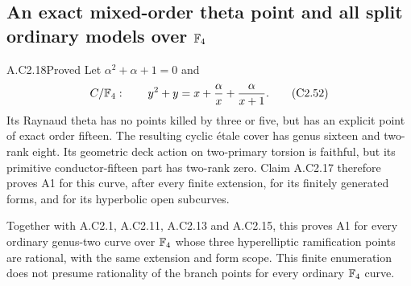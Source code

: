 

\subsection{An exact mixed-order theta point and all split ordinary models over \texorpdfstring{$\mathbb F_4$}{F4}}

\begin{claim}{A.C2.18}{Proved}
Let $\alpha^2+\alpha+1=0$ and
\[
 C/\mathbb F_4:\qquad y^2+y=x+\frac{\alpha}{x}
                         +\frac{\alpha}{x+1}.                 \tag{C2.52}
\]
Its Raynaud theta has no points killed by three or five,
but has an explicit point of exact order fifteen.
The resulting cyclic \'etale cover has genus sixteen
and two-rank eight. Its geometric deck action on
two-primary torsion is faithful, but its primitive
conductor-fifteen part has two-rank zero.
Claim A.C2.17 therefore proves A1 for this curve,
after every finite extension, for its finitely generated
forms, and for its hyperbolic open subcurves.

Together with A.C2.1, A.C2.11, A.C2.13 and A.C2.15,
this proves A1 for every ordinary genus-two curve over
$\mathbb F_4$ whose three hyperelliptic ramification points
are rational, with the same extension and form scope.
This finite enumeration does not presume rationality
of the branch points for every ordinary $\mathbb F_4$ curve.
\end{claim}

